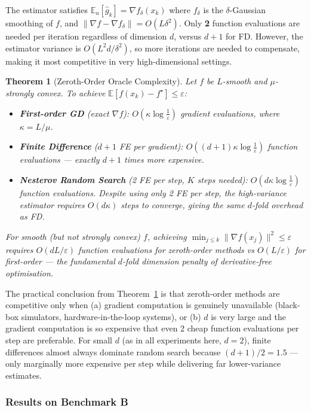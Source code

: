 \documentclass[11pt,a4paper]{article}
\newtheorem{theorem}{Theorem}[section]
\theoremstyle{definition}
\begin{document}
The estimator satisfies $\mathbb{E}_u[\hat{g}_k] = \nabla f_{\delta}(x_k)$ where $f_\delta$ is the $\delta$-Gaussian smoothing of $f$, and $\|\nabla f - \nabla f_\delta\| = O(L\delta^2)$. Only \textbf{2} function evaluations are needed per iteration regardless of dimension $d$, versus $d+1$ for FD. However, the estimator variance is $O(L^2 d/\delta^2)$, so more iterations are needed to compensate, making it most competitive in very high-dimensional settings.

\begin{theorem}[Zeroth-Order Oracle Complexity]
\label{thm:zo_complexity}
Let $f$ be $L$-smooth and $\mu$-strongly convex. To achieve $\mathbb{E}[f(x_k) - f^{\star}] \leq \varepsilon$:
\begin{itemize}
\item \textbf{First-order GD} (exact $\nabla f$): $O\!\left(\kappa \log \frac{1}{\varepsilon}\right)$ gradient evaluations, where $\kappa = L/\mu$.
\item \textbf{Finite Difference} ($d+1$ FE per gradient): $O\!\left((d+1)\kappa \log \frac{1}{\varepsilon}\right)$ function evaluations --- exactly $d+1$ times more expensive.
\item \textbf{Nesterov Random Search} (2 FE per step, $K$ steps needed): $O\!\left(d \kappa \log \frac{1}{\varepsilon}\right)$ function evaluations. Despite using only 2 FE per step, the high-variance estimator requires $O(d\kappa)$ steps to converge, giving the same $d$-fold overhead as FD.
\end{itemize}
For smooth (but not strongly convex) $f$, achieving $\min_{j \leq k}\|\nabla f(x_j)\|^2 \leq \varepsilon$ requires $O(d L / \varepsilon)$ function evaluations for zeroth-order methods vs $O(L/\varepsilon)$ for first-order --- the fundamental $d$-fold dimension penalty of derivative-free optimisation.
\end{theorem}

The practical conclusion from Theorem~\ref{thm:zo_complexity} is that zeroth-order methods are competitive only when (a) gradient computation is genuinely unavailable (black-box simulators, hardware-in-the-loop systems), or (b) $d$ is very large and the gradient computation is so expensive that even 2 cheap function evaluations per step are preferable. For small $d$ (as in all experiments here, $d = 2$), finite differences almost always dominate random search because $(d+1)/2 = 1.5$ --- only marginally more expensive per step while delivering far lower-variance estimates.

\subsubsection{Results on Benchmark B}
\end{document}
